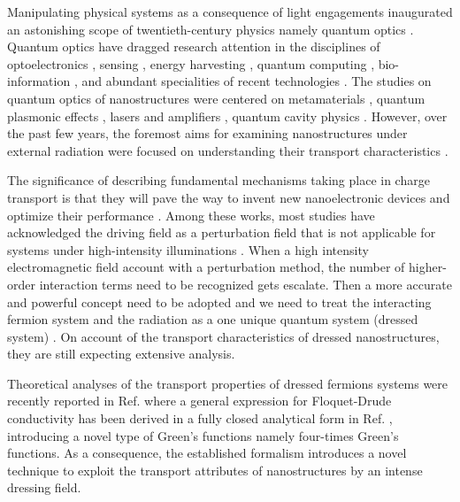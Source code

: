 
Manipulating physical systems as a consequence of light engagements inaugurated an astonishing scope of twentieth-century physics namely quantum optics \cite{grynberg10}.
Quantum optics have dragged research attention in the disciplines of optoelectronics \cite{liu16,wijesekara20,tao21}, sensing \cite{rodrigo2015,pirandola18,hapuarachchi2018}, energy harvesting \cite{yuan16,sun18},
quantum computing \cite{huh15,slussarenko19,andersen21}, bio-information \cite{marais18,bian20}, and abundant specialities of recent technologies \cite{rivera20}.
The studies on quantum optics of nanostructures were centered on metamaterials \cite{shalaev07,si14}, quantum plasmonic effects \cite{hapuarachchi19,perera20}, lasers and amplifiers \cite{zhang05,chow13}, quantum cavity physics \cite{tsang10,devi20}.
However, over the past few years, the foremost aims for examining nanostructures under external radiation were focused on understanding their transport characteristics \cite{kitagawa11,zhou11,kibis14,pervishko15,morina15,dehghani15,dini16,wackerl20}.

The significance of describing fundamental mechanisms taking place in charge transport is that they will pave the way to invent new nanoelectronic devices and optimize their performance \cite{premaratne21}.
Among these works, most studies have acknowledged the driving field as a perturbation field \cite{pervishko15,morina15} that is not applicable for systems under high-intensity illuminations \cite{grifoni98,wackerl20}.
When a high intensity electromagnetic field account with a perturbation method, the number of higher-order interaction terms need to be recognized gets escalate. Then a more accurate and powerful concept need to be adopted and we need to treat the interacting fermion system and the radiation as a one unique quantum system (dressed system) \cite{morina15,cohen98,scully01}. On account of the transport characteristics of dressed nanostructures, they are still expecting extensive analysis.

Theoretical analyses of the transport properties of dressed fermions systems were recently reported in Ref. \cite{kibis14,morina15,wackerl20} where a general expression for Floquet-Drude conductivity has been derived in a fully closed analytical form in Ref. \cite{wackerl20}, introducing a novel type of Green’s functions namely four-times Green’s functions. As a consequence, the established formalism introduces a novel technique to exploit the transport attributes of nanostructures by an intense dressing field.

